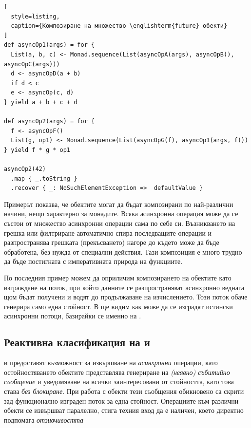 \begin{lstlisting}[
  style=listing,
  caption={Композиране на множество \englishterm{future} обекти}
]
def asyncOp1(args) = for {
  List(a, b, c) <- Monad.sequence(List(asyncOpA(args), asyncOpB(), asyncOpC(args)))
  d <- asyncOpD(a + b)
  if d < c
  e <- asyncOp(c, d)
} yield a + b + c + d

def asyncOp2(args) = for {
  f <- asyncOpF()
  List(g, op1) <- Monad.sequence(List(asyncOpG(f), asyncOp1(args, f)))
} yield f * g * op1

asyncOp2(42)
  .map { _.toString }
  .recover { _: NoSuchElementException =>  defaultValue }
\end{lstlisting}

Примерът показва, че  обектите могат да бъдат композирани по най-различни начини, нещо характерно за монадите. Всяка асинхронна операция може да се състои от множество асинхронни операции сама по себе си. Възникването на грешка или филтриране автоматично спира последващите операции и разпространява грешката (прекъсването) нагоре до където може да бъде обработена, без нужда от специални действия. Тази композиция е много трудно да бъде постигната с императивната природа на  функциите.

По последния пример можем да оприличим композирането на  обектите като изграждане на  поток, при който данните се разпространяват асинхронно веднага щом бъдат получени и водят до продължаване на изчислението. Този поток обаче генерира само една стойност. В  ще видим как може да се изградят истински асинхронни потоци, базирайки се именно на .

\subsection{Реактивна класификация на  и }

 и  предоставят възможност за извършване на \emph{асинхронни} операции, като остойностяването  обектите представлява генериране на \emph{(неявно) събитийно съобщение} и уведомяване на всички заинтересовани от стойността, като това става \emph{без блокиране}. При работа с  обекти тези съобщения обикновено са скрити зад функционално изграден  поток за една стойност. Операциите към различни  обекти се извършват паралелно, стига техния вход да е наличен, което директно подпомага \emph{отзивчивостта}

